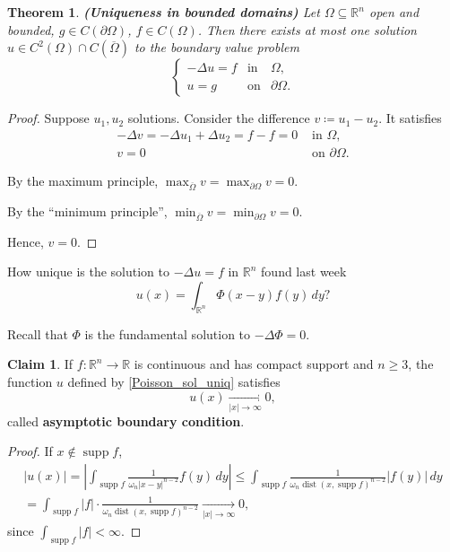 \documentclass[12pt]{article}
\DeclareMathOperator{\supp}{supp}
\DeclareMathOperator{\dist}{dist}
\newtheorem{theorem}{Theorem}[section]
\theoremstyle{definition}
\newtheorem*{claim*}{Claim}
\begin{document}
\begin{theorem}
\emph{\textbf{(Uniqueness in bounded domains)}} Let $\Omega\subseteq\mathbb{R}^n$ open and bounded, $g\in C(\partial\Omega)$, $f\in C(\Omega)$. Then there exists at most one solution $u\in C^2(\Omega)\cap C(\overline{\Omega})$ to the boundary value problem
\[\left\{\begin{array}{lll}-\Delta u=f&\text{in}&\Omega,\\u=g&\text{on}&\partial\Omega.\end{array}\right.\]
\end{theorem}

\begin{proof}
Suppose $u_1,u_2$ solutions. Consider the difference $v\coloneqq u_1-u_2$. It satisfies
\[
\begin{array}{cl}
-\Delta v=-\Delta u_1+\Delta u_2=f-f=0&\text{ in }\Omega,\\
v=0&\text{ on }\partial\Omega.
\end{array}
\]

By the maximum principle, $\max_{\overline{\Omega}}v=\max_{\partial\Omega}v=0$.

By the ``minimum principle'', $\min_{\overline{\Omega}}v=\min_{\partial\Omega}v=0$.

Hence, $v=0$.
\end{proof}

How unique is the solution to $-\Delta u=f$ in $\mathbb{R}^n$ found last week
\begin{equation}\tag{1}\label{Poisson_sol_uniq}
u(x)=\int_{\mathbb{R}^n}\Phi(x-y)f(y)\,dy?
\end{equation}

Recall that $\Phi$ is the fundamental solution to $-\Delta\Phi=0$.

\begin{claim*}
If $f:\mathbb{R}^n\rightarrow\mathbb{R}$ is continuous and has compact support and $n\geq3$, the function $u$ defined by \eqref{Poisson_sol_uniq} satisfies
\[u(x)\xrightarrow[|x|\to\infty]{}0,\]
called \textbf{asymptotic boundary condition}.
\end{claim*}

\begin{proof}
If $x\notin\supp f$,
\begin{multline*}
|u(x)|=\left|\int_{\supp f}\frac{1}{\omega_n|x-y|^{n-2}}f(y)\,dy\right|\leq\int_{\supp f}\frac{1}{\omega_n\dist(x,\supp f)^{n-2}}\big|f(y)\big|\,dy\\
=\int_{\supp f}|f|\cdot\frac{1}{\omega_n\dist(x,\supp f)^{n-2}}\xrightarrow[|x|\to\infty]{}0,
\end{multline*}
since $\int_{\supp f}|f|<\infty$.
\end{proof}
\end{document}
